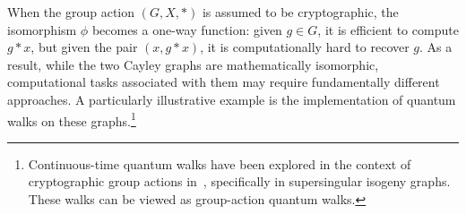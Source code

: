 \documentclass[12pt]{report}
\newcommand{\qft}{\mathsf{QFT}}
\begin{document}
    


    When the group action \( (G, X, *) \) is assumed to be cryptographic, the isomorphism \( \phi \) becomes a one-way function: given \( g \in G \), it is efficient to compute \( g * x \), but given the pair \( (x, g * x) \), it is computationally hard to recover \( g \). As a result, while the two Cayley graphs are mathematically isomorphic, computational tasks associated with them may require fundamentally different approaches. A particularly illustrative example is the implementation of quantum walks on these graphs.\footnote{Continuous-time quantum walks have been explored in the context of cryptographic group actions in~\cite{booher2024failing, doliskani2023sample}, specifically in supersingular isogeny graphs. These walks can be viewed as group-action quantum walks.}
\end{document}
